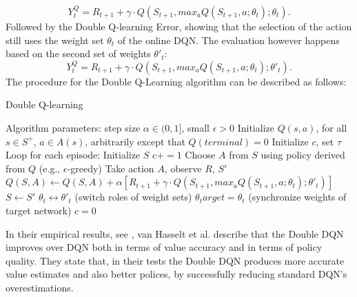 \documentclass[12pt,a4paper]{article}
\begin{document}
\begin{equation}
    \label{eq:q_target_untangled}
    Y_t^Q = R_{t+1} + \gamma \cdot Q(S_{t+1}, max_a Q(S_{t+1}, a;  \theta_t); \theta_t).
\end{equation}
Followed by the Double Q-learning Error, showing that the selection of the action still uses the weight set $\theta_t$ of the online DQN. The evaluation however happens based on the second set of weights $\theta'_t$: 
\begin{equation}
    \label{eq:double_q_target}
    Y_t^Q = R_{t+1} + \gamma \cdot Q(S_{t+1}, max_a Q(S_{t+1}, a;  \theta_t); \theta'_t).
\end{equation}
The procedure for the Double Q-Learning algorithm can be described as follows:
\begin{algorithm}
    \caption{Double Q-learning}
    \begin{algorithmic}
    \State Algorithm parameters: step size $\alpha \in (0, 1]$, small  $\epsilon > 0$
    \State Initialize $Q(s,a)$, for all $s\in S^+$, $a\in A(s)$, arbitrarily except that $Q(terminal)=0$
    \State Initialize $c$, set $\tau$
    \State Loop for each episode:
        \State Initialize $S$
        \State $c += 1$
            \State Choose $A$ from $S$ using policy derived from $Q$ (e.g., $\epsilon$-greedy)
            \State Take action $A$, observe $R$, $S'$
            \State $Q(S, A) \leftarrow Q(S, A) + \alpha [R_{t+1}+\gamma \cdot Q(S_{t+1}, max_a Q(S_{t+1}, a;  \theta_t); \theta'_t)]$
            \State $S \leftarrow S'$
            \State $\theta_t \leftrightarrow \theta'_t$ (switch roles of weight sets)
        \EndFor
            \State $\theta_target = \theta_t $ (synchronize weights of target network)
            \State $c = 0$
        \EndIf
    \EndWhile
    \end{algorithmic}
\end{algorithm}
\newpage
In their empirical results, see \cite{VanHasselt2015}, van Hasselt et al. describe that the Double DQN improves over DQN both in terms of value accuracy and in terms of policy quality. They state that, in their tests the Double DQN produces more accurate value estimates and also better polices, by successfully reducing standard DQN's overestimations.
\end{document}
